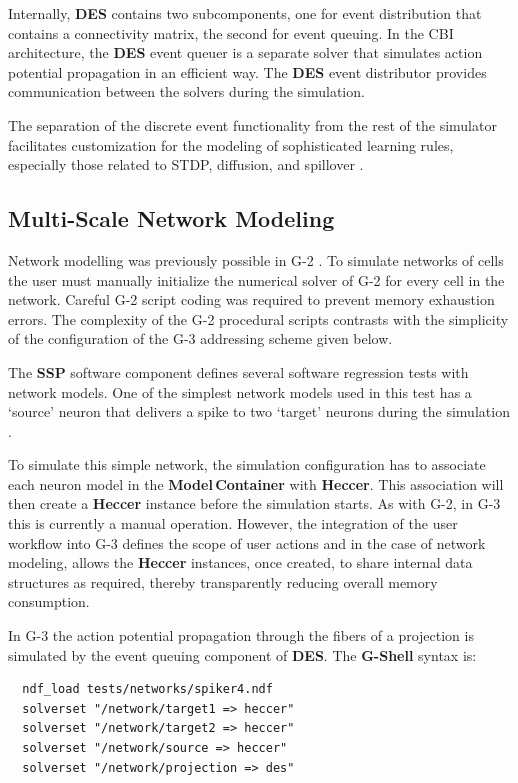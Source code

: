 \documentclass{article}
\begin{document}
Internally, {\bf DES} contains two subcomponents, one for event
distribution that contains a connectivity matrix, the second for event
queuing.  In the CBI architecture, the {\bf DES} event queuer is a
separate solver that simulates action potential propagation in an
efficient way.  The {\bf DES} event distributor provides communication
between the solvers during the simulation.

The separation of the discrete event functionality from the rest of
the simulator facilitates customization for the modeling of
sophisticated learning rules, especially those related to STDP,
diffusion, and spillover \cite{roberts02:_spike, nowotny03:_enhan}.

\subsection{Multi-Scale Network Modeling}

Network modelling was previously possible in
G-2 \cite{cornelis02:_tutor}.  To simulate networks of cells the user
must manually initialize the numerical solver of G-2 for
every cell in the network.  Careful G-2 script coding was required to
prevent memory exhaustion errors.  The complexity of the G-2 procedural scripts contrasts with the simplicity of the configuration of the G-3 addressing scheme given below.


The {\bf SSP} software component defines several software regression
tests with network models.  One of the simplest network models used in
this test has a `source' neuron that delivers a spike to two
`target' neurons during the simulation .

To simulate this simple network, the simulation configuration has to
associate each neuron model in the {\bf Model\,Container} with {\bf
  Heccer}.  This association will then create a {\bf Heccer} instance
before the simulation starts.  As with G-2, in G-3 this is currently a manual
operation.
However, the integration of the user workflow into G-3 defines
the scope of user actions and in the case of network modeling, allows
the {\bf Heccer} instances, once created, to share internal data
structures as required, thereby transparently reducing overall memory consumption.

In G-3 the action potential propagation through the fibers of a
projection is simulated by the event queuing component of {\bf DES}.
The {\bf G-Shell} syntax is:
\begin{verbatim}
  ndf_load tests/networks/spiker4.ndf
  solverset "/network/target1 => heccer"
  solverset "/network/target2 => heccer"
  solverset "/network/source => heccer"
  solverset "/network/projection => des"
\end{verbatim}
\end{document}
